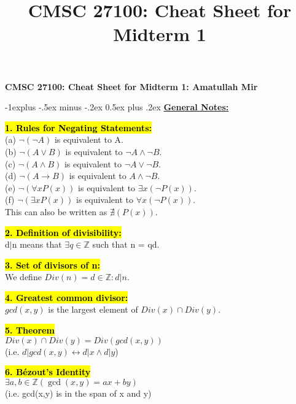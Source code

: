 \documentclass[9pt,landscape]{article}
\title{CMSC 27100: Cheat Sheet for Midterm 1}
\makeatletter
\renewcommand{\subsection}{\@startsection{subsection}{2}{0mm}%
                                {-1explus -.5ex minus -.2ex}%
                                {0.5ex plus .2ex}%
                                {\normalfont\normalsize\bfseries}}
\makeatother
\begin{document}
\raggedright
\footnotesize

\begin{center}
     \Large{\textbf{CMSC 27100: Cheat Sheet for Midterm 1: Amatullah Mir}} \\
     \end{center}
\begin{multicols}{3}
\setlength{\premulticols}{1pt}
\setlength{\postmulticols}{1pt}
\setlength{\multicolsep}{1pt}
\setlength{\columnsep}{2pt}

\subsection{\underline{\textbf{General Notes:}}}
\item {\textbf{\hl{1. Rules for Negating Statements:}}}
\\ (a) $\neg(\neg A)$ is equivalent to A.
\\ (b) $\neg(A \lor B)$ is equivalent to $\neg A \land \neg B.$
\\ (c) $\neg(A \land B)$ is equivalent to $\neg A \lor \neg B.$
\\ (d) $\neg(A \rightarrow B)$ is equivalent to $A \land \neg B.$
\\ (e) $\neg(\forall xP(x))$ is equivalent to $\exists x(\neg P(x)).$
\\ (f) $\neg(\exists xP(x))$ is equivalent to $\forall x(\neg P(x)).$ \\ This can also be written as $\nexists(P(x))$.

\item {\textbf{\hl{2. Definition of divisibility:}}} 
\\ d$|$n means that $\exists q \in \mathbb{Z} $ such that n = qd.

\item {\textbf{\hl{3. Set of divisors of n:}}}
\\ We define $Div(n) = {d \in \mathbb{Z} : d|n}.$

\item {\textbf{\hl{4. Greatest common divisor:}}}
\\ $gcd(x,y)$ is the largest element of $Div(x) \cap Div(y).$

\item {\textbf{\hl{5. Theorem}}}
\\ $Div(x) \cap Div(y) = Div(gcd(x,y))$ 
\\  (i.e. $d | gcd(x,y) \leftrightarrow  d | x \land d |y$)

\item {\textbf{\hl{6. B\'{e}zout's Identity}}}
\\ $\exists a,b \in \mathbb{Z}(\gcd(x,y) = ax + by)$ 
\\ (i.e. gcd(x,y) is in the span of x and y)


\end{multicols}
\end{document}
